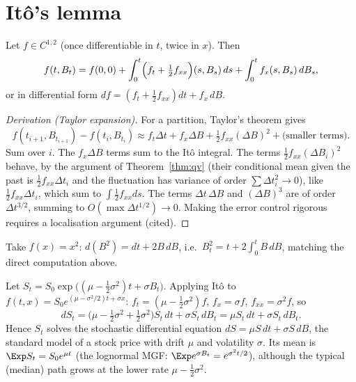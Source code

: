 \section{It\^o's lemma}

\begin{theorem}[It\^o's lemma]\label{thm:ito}
Let $f\in C^{1,2}$ (once differentiable in $t$, twice in $x$). Then
\[
f(t,B_t)=f(0,0)+\int_0^t\Bigl(f_t+\tfrac12f_{xx}\Bigr)(s,B_s)\,ds+\int_0^tf_x(s,B_s)\,dB_s ,
\]
or in differential form $df=(f_t+\tfrac12f_{xx})dt+f_x\,dB$.
\end{theorem}
\begin{proof}[Derivation (Taylor expansion)]
For a partition, Taylor's theorem gives
\[
f(t_{i+1},B_{t_{i+1}})-f(t_i,B_{t_i})\approx f_t\Delta t+f_x\Delta B+\tfrac12f_{xx}(\Delta B)^2+\text{(smaller terms)} .
\]
Sum over $i$. The $f_x\Delta B$ terms sum to the It\^o integral. The terms
$\tfrac12f_{xx}(\Delta B_i)^2$ behave, by the argument of Theorem~\ref{thm:qv} (their
conditional mean given the past is $\tfrac12f_{xx}\Delta t_i$ and the fluctuation has
variance of order $\sum\Delta t_i^2\to0$), like $\tfrac12f_{xx}\Delta t_i$, which sum to
$\int\tfrac12f_{xx}ds$. The terms $\Delta t\,\Delta B$ and $(\Delta B)^3$ are of order
$\Delta t^{3/2}$, summing to $O(\max\Delta t^{1/2})\to0$. Making the error control rigorous requires
a localisation argument (cited).
\end{proof}

\begin{example}
Take $f(x)=x^2$: $d(B^2)=dt+2B\,dB$, i.e.\ $B_t^2=t+2\int_0^tB\,dB$, matching the
direct computation above.
\end{example}

\begin{example}\label{ex:gbm}
Let $S_t=S_0\exp\bigl((\mu-\tfrac12\sigma^2)t+\sigma B_t\bigr)$. Applying It\^o to
$f(t,x)=S_0e^{(\mu-\sigma^2/2)t+\sigma x}$: $f_t=(\mu-\tfrac12\sigma^2)f$, $f_x=\sigma f$,
$f_{xx}=\sigma^2f$, so
\[
dS_t=\bigl(\mu-\tfrac12\sigma^2+\tfrac12\sigma^2\bigr)S_t\,dt+\sigma S_t\,dB_t=\mu S_t\,dt+\sigma S_t\,dB_t .
\]
Hence $S_t$ solves the stochastic differential equation $dS=\mu S\,dt+\sigma S\,dB$, the
standard model of a stock price with drift $\mu$ and volatility $\sigma$. Its mean is
$\Exp S_t=S_0e^{\mu t}$ (the lognormal MGF: $\Exp e^{\sigma B_t}=e^{\sigma^2t/2}$), although the
typical (median) path grows at the lower rate $\mu-\tfrac12\sigma^2$.
\end{example}

